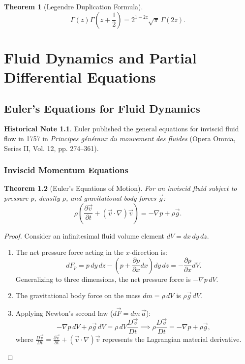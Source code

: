 \documentclass[11pt,a4paper,twoside]{book}
\theoremstyle{eulerstyle}
\newtheorem{theorem}{Theorem}[chapter]
\theoremstyle{definition}
\newtheorem{historical}[theorem]{Historical Note}
\begin{document}
\begin{theorem}[Legendre Duplication Formula]
\[
\Gamma(z)\Gamma\left(z+\frac{1}{2}\right) = 2^{1-2z}\sqrt{\pi}\,\Gamma(2z).
\]
\end{theorem}

\cleardoublepage

\part{Fluid Dynamics and Partial Differential Equations}
\label{part:fluids_pdes}

\chapter{Euler's Equations for Fluid Dynamics}
\label{ch:streamlines}

\begin{historical}
Euler published the general equations for inviscid fluid flow in 1757 in \emph{Principes généraux du mouvement des fluides} (Opera Omnia, Series II, Vol. 12, pp. 274--361).
\end{historical}

\section{Inviscid Momentum Equations}
\begin{theorem}[Euler's Equations of Motion]
For an inviscid fluid subject to pressure $p$, density $\rho$, and gravitational body forces $\vec{g}$:
\[
\rho \left( \frac{\partial \vec{v}}{\partial t} + (\vec{v} \cdot \nabla)\vec{v} \right) = -\nabla p + \rho \vec{g}.
\]
\end{theorem}
\begin{proof}
Consider an infinitesimal fluid volume element $dV = dx\, dy\, dz$.
\begin{enumerate}
    \item The net pressure force acting in the $x$-direction is:
    \[
    dF_p = p\, dy\, dz - \left(p + \frac{\partial p}{\partial x} dx\right) dy\, dz = -\frac{\partial p}{\partial x} dV.
    \]
    Generalizing to three dimensions, the net pressure force is $-\nabla p\, dV$.
    \item The gravitational body force on the mass $dm = \rho\, dV$ is $\rho \vec{g}\, dV$.
    \item Applying Newton's second law ($d\vec{F} = dm\, \vec{a}$):
    \[
    -\nabla p\, dV + \rho \vec{g}\, dV = \rho\, dV \frac{D\vec{v}}{Dt} \implies \rho \frac{D\vec{v}}{Dt} = -\nabla p + \rho \vec{g},
    \]
    where $\frac{D\vec{v}}{Dt} = \frac{\partial \vec{v}}{\partial t} + (\vec{v} \cdot \nabla)\vec{v}$ represents the Lagrangian material derivative.
\end{enumerate}
\end{proof}
\end{document}
